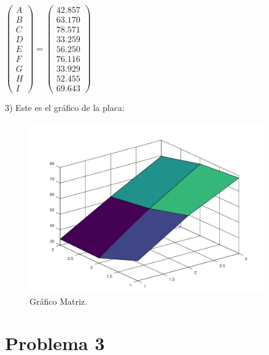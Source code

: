 \documentclass[10pt,twoside]{article}
\begin{document}
\vspace{2.5mm}
$
\begin{pmatrix}
  A \\
   B \\
   C \\
   D \\
   E \\
   F \\
   G \\
   H \\
   I  
  \end{pmatrix}
   = \begin{pmatrix}
  42.857 \\
   63.170 \\
   78.571 \\
   33.259 \\
   56.250 \\
   76.116 \\
   33.929 \\
   52.455 \\
   69.643  
  \end{pmatrix}
 $

\begin{flushleft}
3) Este es el gráfico de la placa:
\begin{figure}[H]
  \caption{Gráfico Matriz.}
  \centering
    \includegraphics[width=0.9\textwidth]{Grafico}
\end{figure}
\end{flushleft}


\clearpage
\section{Problema 3}
\end{document}
